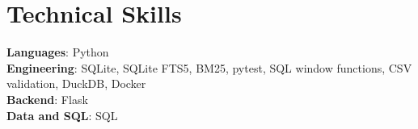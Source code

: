 \section{Technical Skills}
\begin{itemize}[leftmargin=0.15in, label={}]
\small{\item{\strut
\textbf{Languages}: Python \\
\textbf{Engineering}: SQLite, SQLite FTS5, BM25, pytest, SQL window functions, CSV validation, DuckDB, Docker \\
\textbf{Backend}: Flask \\
\textbf{Data and SQL}: SQL \\
}}
\end{itemize}

